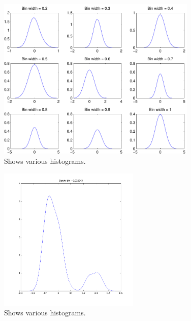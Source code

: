 \begin{figure}[!htbp]
  \centering
  \includegraphics[width=0.85\textwidth]{./images/q37kde}
  \caption{Shows various histograms.}
  \label{fig:q37kde}
\end{figure}

\begin{figure}[!htbp]
  \centering
  \includegraphics[width=0.6\textwidth]{./images/q37kdeauto}
  \caption{Shows various histograms.}
  \label{fig:q37kdeauto}
\end{figure}
